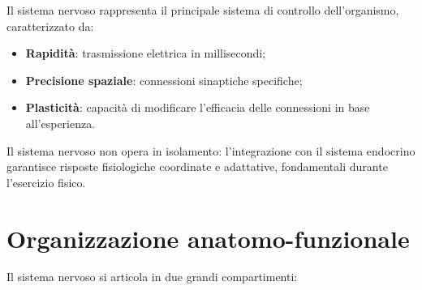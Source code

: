 \documentclass[11pt,a4paper,italian,twoside]{report}
\theoremstyle{definition} %
\begin{document}
Il sistema nervoso rappresenta il principale sistema di controllo dell'organismo, caratterizzato da:
\begin{itemize}[leftmargin=1.2em,noitemsep,topsep=0pt,partopsep=0pt]
  \item \textbf{Rapidità}: trasmissione elettrica in millisecondi;
  \item \textbf{Precisione spaziale}: connessioni sinaptiche specifiche;
  \item \textbf{Plasticità}: capacità di modificare l'efficacia delle connessioni in base all'esperienza.
\end{itemize}

\begin{concetto}
Il sistema nervoso non opera in isolamento: l'integrazione con il sistema endocrino garantisce risposte fisiologiche coordinate e adattative, fondamentali durante l'esercizio fisico.
\end{concetto}

\section{Organizzazione anatomo-funzionale}
\label{sec:organizzazione_anatomo_funzionale}

Il sistema nervoso si articola in due grandi compartimenti:
\end{document}
